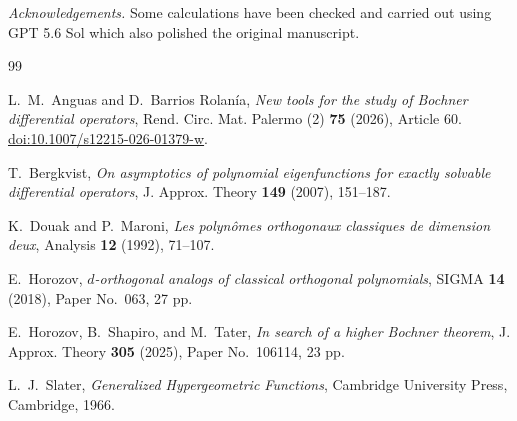 \documentclass{amsart}
\theoremstyle{definition}
\begin{document}
\medskip \noindent
\emph{Acknowledgements.} Some calculations have been checked and carried out using GPT 5.6 Sol which also  polished the original manuscript.   


\begin{thebibliography}{99}

L.~M.~Anguas and D.~Barrios Rolan\'ia,
\emph{New tools for the study of Bochner differential operators},
Rend. Circ. Mat. Palermo (2) \textbf{75} (2026), Article 60.
\href{https://doi.org/10.1007/s12215-026-01379-w}
{doi:10.1007/s12215-026-01379-w}.

T.~Bergkvist,
\emph{On asymptotics of polynomial eigenfunctions for exactly solvable
differential operators},
J. Approx. Theory \textbf{149} (2007), 151--187.

K.~Douak and P.~Maroni,
\emph{Les polyn\^omes orthogonaux classiques de dimension deux},
Analysis \textbf{12} (1992), 71--107.

E.~Horozov,
\emph{$d$-orthogonal analogs of classical orthogonal polynomials},
SIGMA \textbf{14} (2018), Paper No.~063, 27 pp.

E.~Horozov, B.~Shapiro, and M.~Tater,
\emph{In search of a higher Bochner theorem},
J. Approx. Theory \textbf{305} (2025), Paper No.~106114, 23 pp.

L.~J.~Slater,
\emph{Generalized Hypergeometric Functions},
Cambridge University Press, Cambridge, 1966.

\end{thebibliography}
\end{document}
